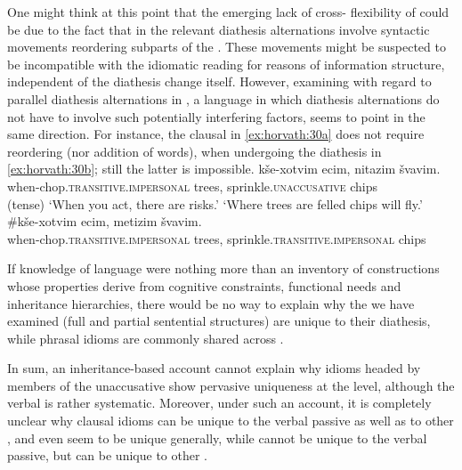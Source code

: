 \documentclass[output=paper,
modfonts
]{LSP/langsci}
\begin{document}
One might think at this point that the emerging lack of cross-
flexibility of  could be due to the fact that in 
the relevant diathesis alternations involve syntactic movements
reordering subparts of the . These movements might be suspected to
be incompatible with the idiomatic reading for reasons of information
structure, independent of the diathesis change itself. However,
examining  with regard to parallel diathesis alternations
in , a language in which diathesis alternations do not have to
involve such potentially interfering factors, seems to point in the same
direction. For instance, the  clausal  in \ref{ex:horvath:30a} does not
require reordering (nor addition of words), when undergoing the
diathesis  in \ref{ex:horvath:30b}; still the latter is impossible.
\ea \label{ex:horvath:30}
	\ea \label{ex:horvath:30a} \gll kše-xotvim ecim, nitazim švavim.\\
	when-chop.\textsc{transitive.impersonal} trees, sprinkle.\textsc{unaccusative} chips\\ \hfill (tense)
	\glt `When you act, there are risks.' `Where trees are felled chips will fly.'
	\ex \label{ex:horvath:30b} \gll \#kše-xotvim ecim, metizim švavim.\\
	when-chop.\textsc{transitive.impersonal} trees, sprinkle.\textsc{transitive.impersonal} chips\\
	\z
\z

If knowledge of language were nothing more than an inventory of
constructions whose properties derive from cognitive constraints,
functional needs and inheritance hierarchies, there would be no way to
explain why the  we have examined (full and partial
sentential structures) are unique to their diathesis, while phrasal
idioms are commonly shared across .

In sum, an inheritance-based account cannot explain why idioms headed by
members of the unaccusative  show pervasive uniqueness at the
 level, although the verbal  is rather systematic.
Moreover, under such an account, it is completely unclear why clausal
idioms can be unique to the verbal passive as well as to other
, and even seem to be unique generally, while 
cannot be unique to the verbal passive, but can be unique to other
.
\end{document}
